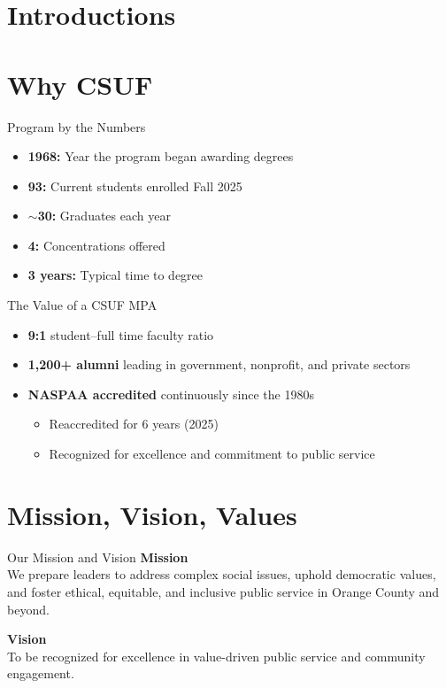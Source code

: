 \documentclass[10pt]{beamer}
\begin{document}
\section{\textcolor{titanorange}{Introductions}}

\section{\textcolor{titanorange}{Why CSUF}}
\begin{frame}{Program by the Numbers}
\begin{Large}
\begin{itemize}
  \item \textbf{1968:} Year the program began awarding degrees
  \item \textbf{93:} Current students enrolled Fall 2025
  \item \textbf{\(\sim\)30:} Graduates each year
  \item \textbf{4:} Concentrations offered
  \item \textbf{3 years:} Typical time to degree
\end{itemize}
\end{Large}
\end{frame}

\begin{frame}{The Value of a CSUF MPA}
\begin{Large}
\begin{itemize}
  \item \textbf{9:1} student--full time faculty ratio
  \item \textbf{1,200+ alumni} leading in government, nonprofit, and private sectors
  \item \textbf{NASPAA accredited} continuously since the 1980s
    \begin{itemize}
      \item Reaccredited for 6 years (2025)
      \item Recognized for excellence and commitment to public service
    \end{itemize}
\end{itemize}
\end{Large}
\end{frame}

\section{\textcolor{titanorange}{Mission, Vision, Values}}

\begin{frame}{Our Mission and Vision}
\textbf{Mission}\\
We prepare leaders to address complex social issues, uphold democratic values, and foster ethical, equitable, and inclusive public service in Orange County and beyond.

\vspace{0.8em}
\textbf{Vision}\\
To be recognized for excellence in value-driven public service and community engagement.
\end{frame}
\end{document}
